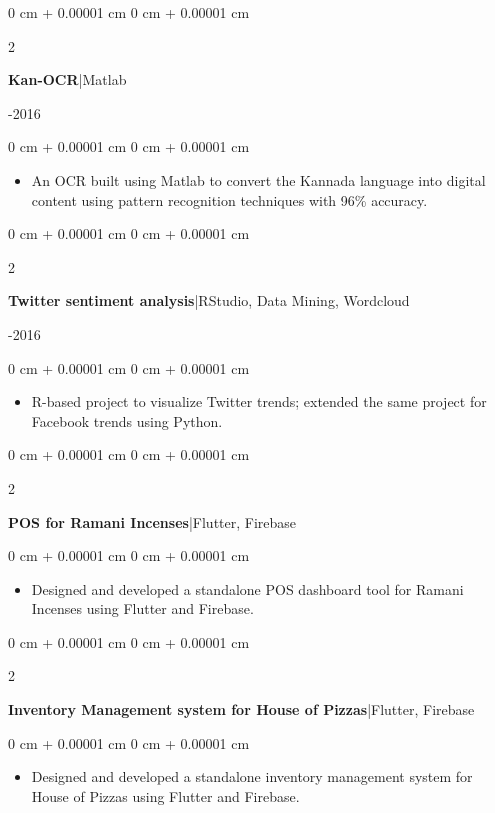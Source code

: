 \documentclass[10pt, letterpaper]{article}
\newenvironment{highlights}{
    \begin{itemize}[
        topsep=0.10 cm,
        parsep=0.10 cm,
        partopsep=0pt,
        itemsep=0pt,
        leftmargin=0 cm + 10pt
    ]
}{
    \end{itemize}
} %
\newenvironment{onecolentry}{
    \begin{adjustwidth}{
        0 cm + 0.00001 cm
    }{
        0 cm + 0.00001 cm
    }
}{
    \end{adjustwidth}
} %
\newenvironment{twocolentry}[2][]{
    \onecolentry
    \def\secondColumn{#2}
    \setcolumnwidth{\fill, 4.5 cm}
    \begin{paracol}{2}
}{
    \switchcolumn \raggedleft \secondColumn
    \end{paracol}
    \endonecolentry
} %
\begin{document}
        \vspace{0.2 cm}

        \begin{twocolentry}{2012-2016}
            \textbf{Kan-OCR}|Matlab
        \end{twocolentry}
        \begin{onecolentry}
          \begin{highlights}
              \item An OCR built using Matlab to convert the Kannada language into digital content using pattern recognition techniques with 96\% accuracy.
            \end{highlights}
        \end{onecolentry}

        \vspace{0.2 cm}

        \begin{twocolentry}{2016-2016}
           \textbf{Twitter sentiment analysis}|RStudio, Data Mining, Wordcloud
        \end{twocolentry}
        \begin{onecolentry}
            \begin{highlights}
               \item R-based project to visualize Twitter trends; extended the same project for Facebook trends using Python.
         \end{highlights}
        \end{onecolentry}

        \vspace{0.2 cm}

        \begin{twocolentry}{}
            \textbf{POS for Ramani Incenses}|Flutter, Firebase
        \end{twocolentry}
        \begin{onecolentry}
         \begin{highlights}
                \item Designed and developed a standalone POS dashboard tool for Ramani Incenses using Flutter and Firebase.
            \end{highlights}
        \end{onecolentry}

        \vspace{0.2 cm}

        \begin{twocolentry}{}
            \textbf{Inventory Management system for House of Pizzas}|Flutter, Firebase
        \end{twocolentry}
        \begin{onecolentry}
         \begin{highlights}
                \item Designed and developed a standalone inventory management system for House of Pizzas using Flutter and Firebase.
            \end{highlights}
        \end{onecolentry}
\end{document}
